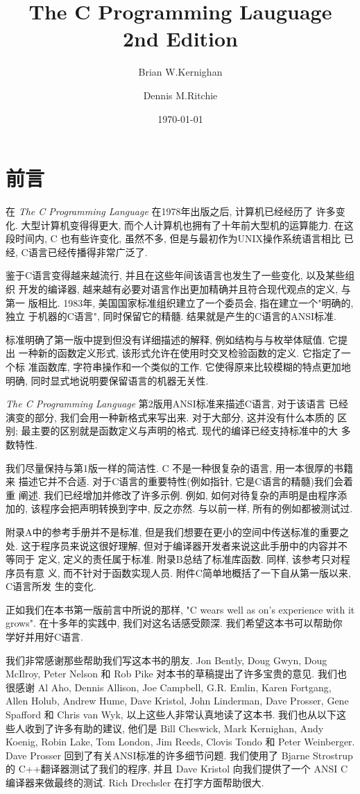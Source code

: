 \documentclass[nofonts, a4paper, oneside, 10pt]{ctexbook}
\title{The C Programming Lauguage \\ 2nd Edition}
\author{Brian W.Kernighan \and Dennis M.Ritchie}
\date{\today}
\numberwithin{exercnt}{chapter}
\begin{document}
\frontmatter
\maketitle
\tableofcontents
\chapter{前言}
在 \textit{The C Programming Language} 在1978年出版之后, 计算机已经经历了
许多变化. 大型计算机变得得更大, 而个人计算机也拥有了十年前大型机的运算能力.
在这段时间内, C 也有些许变化, 虽然不多, 但是与最初作为UNIX操作系统语言相比
已经, C语言已经传播得非常广泛了.

鉴于C语言变得越来越流行, 并且在这些年间该语言也发生了一些变化, 以及某些组织
开发的编译器, 越来越有必要对语言作出更加精确并且符合现代观点的定义, 与第一
版相比. 1983年, 美国国家标准组织建立了一个委员会, 指在建立一个"明确的, 独立
于机器的C语言", 同时保留它的精髓. 结果就是产生的C语言的ANSI标准.

标准明确了第一版中提到但没有详细描述的解释, 例如结构与与枚举体赋值. 它提出
一种新的函数定义形式, 该形式允许在使用时交叉检验函数的定义. 它指定了一个标
准函数库, 字符串操作和一个类似的工作. 它使得原来比较模糊的特点更加地明确,
同时显式地说明要保留语言的机器无关性.

\textit{The C Programming Language} 第2版用ANSI标准来描述C语言, 对于该语言
已经演变的部分, 我们会用一种新格式来写出来. 对于大部分, 这并没有什么本质的
区别; 最主要的区别就是函数定义与声明的格式. 现代的编译已经支持标准中的大
多数特性.

我们尽量保持与第1版一样的简洁性. C 不是一种很复杂的语言, 用一本很厚的书籍来
描述它并不合适. 对于C语言的重要特性(例如指针, 它是C语言的精髓)我们会着重
阐述. 我们已经增加并修改了许多示例. 例如, 如何对待复杂的声明是由程序添加的,
该程序会把声明转换到字中, 反之亦然. 与以前一样, 所有的例如都被测试过.

附录A中的参考手册并不是标准, 但是我们想要在更小的空间中传送标准的重要之处.
这于程序员来说这很好理解, 但对于编译器开发者来说这此手册中的内容并不等同于
定义, 定义的责任属于标准. 附录B总结了标准库函数. 同样, 该参考只对程序员有意
义, 而不针对于函数实现人员. 附件C简单地概括了一下自从第一版以来, C语言所发
生的变化.

正如我们在本书第一版前言中所说的那样, "C wears well as on's experience with
it grows". 在十多年的实践中, 我们对这名话感受颇深. 我们希望这本书可以帮助你
学好并用好C语言.

我们非常感谢那些帮助我们写这本书的朋友. Jon Bently, Doug Gwyn, Doug McIlroy,
Peter Nelson 和 Rob Pike 对本书的草稿提出了许多宝贵的意见. 我们也很感谢
Al Aho, Dennis Allison, Joe Campbell, G.R. Emlin, Karen Fortgang, Allen
Holub, Andrew Hume, Dave Kristol, John Linderman, Dave Prosser, Gene 
Spafford 和 Chris van Wyk, 以上这些人非常认真地读了这本书. 我们也从以下这
些人收到了许多有助的建议, 他们是 Bill Cheswick, Mark Kernighan, Andy 
Koenig, Robin Lake, Tom London, Jim Reeds, Clovis Tondo 和 Peter Weinberger.
Dave Prosser 回到了有关ANSI标准的许多细节问题.  我们使用了 Bjarne Strostrup
的 C++翻译器测试了我们的程序, 并且 Dave Kristol 向我们提供了一个 ANSI C 
编译器来做最终的测试. Rich Drechsler 在打字方面帮助很大.
\end{document}
